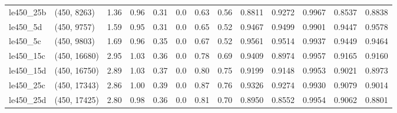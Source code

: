 \begin{tabular}{llrrrrrrrrrrr}
 le450\_25b &  (450, 8263) &  1.36 & 0.96 & 0.31 &  0.0 &  0.63 &   0.56 &   0.8811 &   0.9272 &    0.9967 &     0.8537 &      0.8838 \\
  le450\_5d &  (450, 9757) &  1.59 & 0.95 & 0.31 &  0.0 &  0.65 &   0.52 &   0.9467 &   0.9499 &    0.9901 &     0.9447 &      0.9578 \\
  le450\_5c &  (450, 9803) &  1.69 & 0.96 & 0.35 &  0.0 &  0.67 &   0.52 &   0.9561 &   0.9514 &    0.9937 &     0.9449 &      0.9464 \\
 le450\_15c & (450, 16680) &  2.95 & 1.03 & 0.36 &  0.0 &  0.78 &   0.69 &   0.9409 &   0.8974 &    0.9957 &     0.9165 &      0.9160 \\
 le450\_15d & (450, 16750) &  2.89 & 1.03 & 0.37 &  0.0 &  0.80 &   0.75 &   0.9199 &   0.9148 &    0.9953 &     0.9021 &      0.8973 \\
 le450\_25c & (450, 17343) &  2.86 & 1.00 & 0.39 &  0.0 &  0.87 &   0.76 &   0.9326 &   0.9274 &    0.9930 &     0.9079 &      0.9014 \\
 le450\_25d & (450, 17425) &  2.80 & 0.98 & 0.36 &  0.0 &  0.81 &   0.70 &   0.8950 &   0.8552 &    0.9954 &     0.9062 &      0.8801 \\
\bottomrule
\end{tabular}
